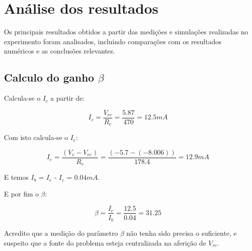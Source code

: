 \section{Análise dos resultados}

Os principais resultados obtidos a partir das medições e simulações realizadas no experimento foram analisados, incluindo comparações com os resultados numéricos e as conclusões relevantes.

\subsection{Calculo do ganho $\beta$}

Calcula-se o $I_c$ a partir de:

\begin{equation}
    I_c = \frac{V_{rc}}{R_c} = \frac{5.87}{470} = 12.5 mA
\end{equation}

Com isto calcula-se o $I_e$:

\begin{equation}
    I_e = \frac{(V_e - V_{ee})}{R_e} = \frac{(-5.7 - (-8.006))}{178.4} = 12.9 mA
\end{equation}

E temos $I_b$ = $I_e$ - $I_c$ = $0.04 mA$.

E por fim o $\beta$:

\begin{equation}
    \beta = \frac{I_c}{I_b} = \frac{12.5}{0.04} = 31.25
\end{equation}

Acredito que a medição do parâmetro $\beta$ não tenha sido precisa o suficiente, e suspeito que a fonte do problema esteja centralizada na aferição de $V_{rc}$.
